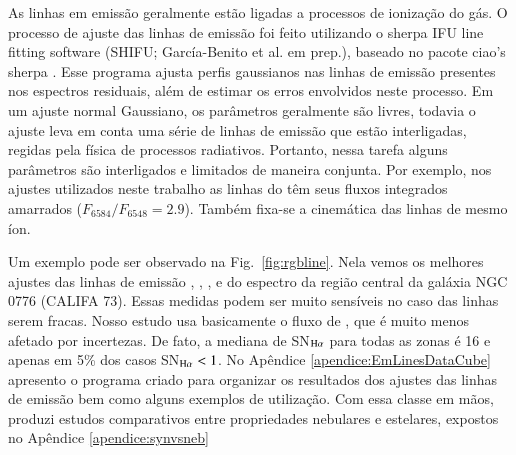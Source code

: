 As linhas em emissão geralmente estão ligadas a processos de ionização do gás. O processo de ajuste das linhas de emissão foi feito utilizando o {\sc sherpa} IFU line fitting software (SHIFU; García-Benito et al. em prep.), baseado no pacote {\sc ciao's sherpa} \citep{Freeman.etal.2001, Doe.etal.2007}. Esse programa ajusta perfis gaussianos nas linhas de emissão presentes nos espectros residuais, além de estimar os erros envolvidos neste processo. Em um ajuste normal Gaussiano, os parâmetros geralmente são livres, todavia o ajuste leva em conta uma série de linhas de emissão que estão interligadas, regidas pela física de processos radiativos. Portanto, nessa tarefa alguns parâmetros são interligados e limitados de maneira conjunta. Por exemplo, nos ajustes utilizados neste trabalho as linhas do \nii têm seus fluxos integrados amarrados ($F_{6584}/F_{6548} = 2.9$). Também fixa-se a cinemática das linhas de mesmo íon.

Um exemplo pode ser observado na Fig.\ \ref{fig:rgbline}. Nela vemos os melhores ajustes das linhas de emissão \Hb, \oiii, \nii, \Ha e \sii do espectro da região central da galáxia NGC 0776 (CALIFA 73). Essas medidas podem ser muito sensíveis no caso das linhas serem fracas. Nosso estudo usa basicamente o fluxo de \Ha, que é muito menos afetado por incertezas. De fato, a mediana de SN$_{\Ha}$ para todas as zonas é 16 e apenas em 5\% dos casos SN$_{\Ha} < 1$. No Apêndice \ref{apendice:EmLinesDataCube} apresento o programa criado para organizar os resultados dos ajustes das linhas de emissão bem como alguns exemplos de utilização. Com essa classe em mãos, produzi estudos comparativos entre propriedades nebulares e estelares, expostos no Apêndice \ref{apendice:synvsneb}


